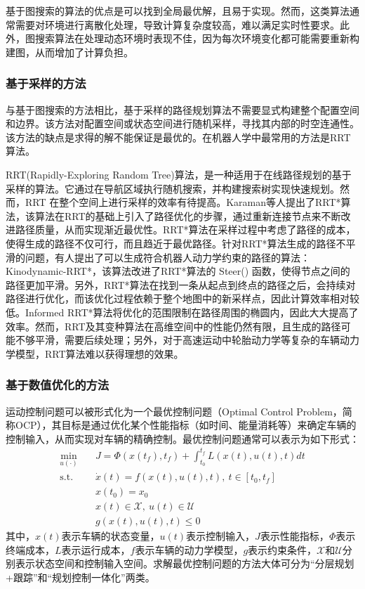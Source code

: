 基于图搜索的算法的优点是可以找到全局最优解，且易于实现。然而，这类算法通常需要对环境进行离散化处理，导致计算复杂度较高，难以满足实时性要求。此外，图搜索算法在处理动态环境时表现不佳，因为每次环境变化都可能需要重新构建图，从而增加了计算负担。
\subsubsection{基于采样的方法}
与基于图搜索的方法相比，基于采样的路径规划算法不需要显式构建整个配置空间和边界。该方法对配置空间或状态空间进行随机采样，寻找其内部的时空连通性。该方法的缺点是求得的解不能保证是最优的。在机器人学中最常用的方法是RRT算法。

RRT(Rapidly-Exploring Random Tree)算法\cite{lavalle1998rapidly}，是一种适用于在线路径规划的基于采样的算法。它通过在导航区域执行随机搜索，并构建搜索树实现快速规划。然而，RRT 在整个空间上进行采样的效率有待提高。Karaman等人提出了RRT*算法\cite{karaman2011sampling}，该算法在RRT的基础上引入了路径优化的步骤，通过重新连接节点来不断改进路径质量，从而实现渐近最优性。RRT*算法在采样过程中考虑了路径的成本，使得生成的路径不仅可行，而且趋近于最优路径。针对RRT*算法生成的路径不平滑的问题，有人提出了可以生成符合机器人动力学约束的路径的算法：Kinodynamic-RRT*\cite{webb2013kinodynamic}，该算法改进了RRT*算法的 Steer() 函数，使得节点之间的路径更加平滑。另外，RRT*算法在找到一条从起点到终点的路径之后，会持续对路径进行优化，而该优化过程依赖于整个地图中的新采样点，因此计算效率相对较低。Informed RRT*算法\cite{gammell2014informed}将优化的范围限制在路径周围的椭圆内，因此大大提高了效率。然而，RRT及其变种算法在高维空间中的性能仍然有限，且生成的路径可能不够平滑，需要后续处理；另外，对于高速运动中轮胎动力学等复杂的车辆动力学模型，RRT算法难以获得理想的效果。
\subsubsection{基于数值优化的方法}
运动控制问题可以被形式化为一个最优控制问题（Optimal Control Problem，简称OCP），其目标是通过优化某个性能指标（如时间、能量消耗等）来确定车辆的控制输入，从而实现对车辆的精确控制\cite{lewis2012optimal}。最优控制问题通常可以表示为如下形式：
\begin{equation}
\begin{aligned}
 \min_{u(\cdot)}\quad & J=\Phi(x(t_f),t_f)+\int_{t_0}^{t_f}L(x(t),u(t),t)dt \\
 \text{s.t.}\quad & \dot{x}(t)=f(x(t),u(t),t),\ t\in[t_0,t_f] \\
 & x(t_0)=x_0 \\
 & x(t)\in\mathcal{X},\ u(t)\in\mathcal{U} \\
 & g(x(t),u(t),t)\leq0
\end{aligned}
\label{equ:ocp}
\end{equation}
其中，$x(t)$表示车辆的状态变量，$u(t)$表示控制输入，$J$表示性能指标，$\Phi$表示终端成本，$L$表示运行成本，$f$表示车辆的动力学模型，$g$表示约束条件，$\mathcal{X}$和$\mathcal{U}$分别表示状态空间和控制输入空间。求解最优控制问题的方法大体可分为“分层规划+跟踪”和“规划控制一体化”两类。

